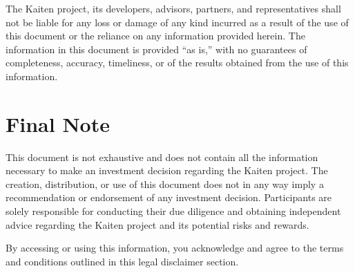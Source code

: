 \documentclass[11pt,oneside,a4paper]{article}
\begin{document}
The Kaiten project, its developers, advisors, partners, and representatives shall not be liable for any loss or damage of any kind incurred as a result of the use of this document or the reliance on any information provided herein. The information in this document is provided “as is,” with no guarantees of completeness, accuracy, timeliness, or of the results obtained from the use of this information.


\section{Final Note}

This document is not exhaustive and does not contain all the information necessary to make an investment decision regarding the Kaiten project. The creation, distribution, or use of this document does not in any way imply a recommendation or endorsement of any investment decision. Participants are solely responsible for conducting their due diligence and obtaining independent advice regarding the Kaiten project and its potential risks and rewards.

By accessing or using this information, you acknowledge and agree to the terms and conditions outlined in this legal disclaimer section.
\end{document}
